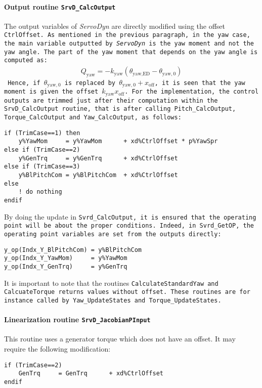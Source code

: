 \documentclass[11pt]{article}
\begin{document}
\paragraph{Output routine \tt{SrvD\_CalcOutput}}
The output variables of \textit{ServoDyn} are directly modified using the offset \tt{CtrlOffset}.
As mentioned in the previous paragraph, in the yaw case, the main variable outputted by \textit{ServoDyn} is the yaw moment and not the yaw angle. The part of the yaw moment that depends on the yaw angle is computed as:
\begin{align}
    Q_\text{yaw}= - k_\text{yaw} ( \theta_\text{yaw,ED} - \theta_{\text{yaw},0})
\end{align}
Hence, if $\theta_{\text{yaw},0}$ is replaced by  $\theta_{\text{yaw},0}+x_\text{off}$, it is seen that the yaw moment is given the offset $k_\text{yaw} x_\text{off}$.
% 
% 
For the implementation, the control outputs are trimmed just after their computation within the  \tt{SrvD\_CalcOutput} routine, that is after calling \tt{Pitch\_CalcOutput}, \tt{Torque\_CalcOutput} and \tt{Yaw\_CalcOutput}, as follows:
\begin{lstlisting}
if (TrimCase==1) then
    y%YawMom     = y%YawMom      + xd%CtrlOffset * p%YawSpr
else if (TrimCase==2)
    y%GenTrq     = y%GenTrq      + xd%CtrlOffset
else if (TrimCase==3)
    y%BlPitchCom = y%BlPitchCom  + xd%CtrlOffset
else
    ! do nothing
endif
\end{lstlisting}
By doing the update in \tt{Svrd\_CalcOutput}, it is ensured that the operating point will be about the proper conditions. Indeed, in \tt{Svrd\_GetOP}, the operating point variables are set from the outputs directly:
\begin{lstlisting}
y_op(Indx_Y_BlPitchCom) = y%BlPitchCom
y_op(Indx_Y_YawMom)     = y%YawMom 
y_op(Indx_Y_GenTrq)     = y%GenTrq
\end{lstlisting}
It is important to note that the routines \tt{CalculateStandardYaw} and \tt{CalcuateTorque} returns values without offset. These routines are for instance called by  \tt{Yaw\_UpdateStates}  and \tt{Torque\_UpdateStates}.

\paragraph{Linearization routine \tt{SrvD\_JacobianPInput}}
This routine uses a generator torque which does not have an offset. 
It may require the following modification:
\begin{lstlisting}
if (TrimCase==2)
    GenTrq     = GenTrq      + xd%CtrlOffset
endif
\end{lstlisting}
\end{document}
